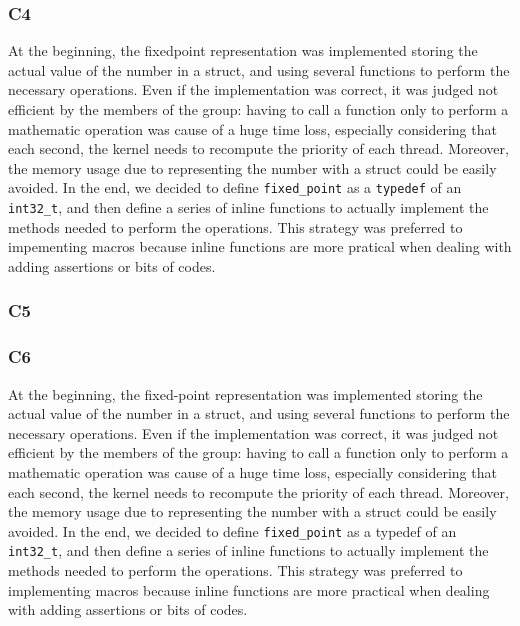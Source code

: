 \documentclass[a4wide, 11pt]{article}
\newcommand{\tx}{\texttt}
\begin{document}
\subsubsection{C4}
At the beginning, the fixed\-point representation was implemented storing the actual value of the number in a struct, and using several functions to perform the necessary operations. Even if the implementation was correct, it was judged not efficient by the members of the group: having to call a function only to perform a mathematic operation was cause of a huge time loss, especially considering that each second, the kernel needs to recompute the priority of each thread. Moreover, the memory usage due to representing the number with a struct could be easily avoided. In the end, we decided to define \tx{fixed\_point} as a \tx{typedef} of an \tx{int32\_t}, and then define a series of inline functions to actually implement the methods needed to perform the operations. This strategy was preferred to impementing macros because inline functions are more pratical when dealing with adding assertions or bits of codes.

\subsubsection{C5}

\subsubsection{C6}

At the beginning, the fixed-point representation was implemented storing the actual value of the number in a struct, and using several functions to  perform the necessary operations. Even if the implementation was correct, it was judged not efficient by the members of the group: having to call a function only to perform a mathematic operation was cause of a huge time loss, especially considering that each second, the kernel needs to recompute the priority of each thread. Moreover, the memory usage due to representing the number with a struct could be easily avoided. In the end, we decided to define \texttt{fixed\_point} as a typedef of an \texttt{int32\_t}, and then define a series of inline functions to actually implement the methods needed to perform the operations. This strategy was preferred to implementing macros because inline functions are more practical when dealing with adding assertions or bits of codes.
\end{document}
